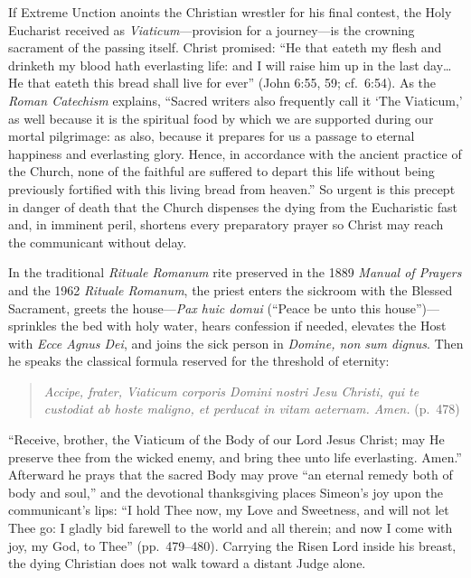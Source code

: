 If Extreme Unction anoints the Christian wrestler for his final contest, the Holy Eucharist received as \emph{Viaticum}---provision for a journey---is the crowning sacrament of the passing itself. Christ promised: ``He that eateth my flesh and drinketh my blood hath everlasting life: and I will raise him up in the last day\ldots{} He that eateth this bread shall live for ever'' (John 6:55, 59; cf.\ 6:54). As the \emph{Roman Catechism} explains, ``Sacred writers also frequently call it `The Viaticum,' as well because it is the spiritual food by which we are supported during our mortal pilgrimage: as also, because it prepares for us a passage to eternal happiness and everlasting glory. Hence, in accordance with the ancient practice of the Church, none of the faithful are suffered to depart this life without being previously fortified with this living bread from heaven.'' So urgent is this precept in danger of death that the Church dispenses the dying from the Eucharistic fast and, in imminent peril, shortens every preparatory prayer so Christ may reach the communicant without delay.

In the traditional \emph{Rituale Romanum} rite preserved in the 1889 \emph{Manual of Prayers} and the 1962 \emph{Rituale Romanum}, the priest enters the sickroom with the Blessed Sacrament, greets the house---\emph{Pax huic domui} (``Peace be unto this house'')---sprinkles the bed with holy water, hears confession if needed, elevates the Host with \emph{Ecce Agnus Dei}, and joins the sick person in \emph{Domine, non sum dignus}. Then he speaks the classical formula reserved for the threshold of eternity:

\begin{quote}
\emph{Accipe, frater, Viaticum corporis Domini nostri Jesu Christi, qui te custodiat ab hoste maligno, et perducat in vitam aeternam. Amen.} (p.\ 478)
\end{quote}

``Receive, brother, the Viaticum of the Body of our Lord Jesus Christ; may He preserve thee from the wicked enemy, and bring thee unto life everlasting. Amen.'' Afterward he prays that the sacred Body may prove ``an eternal remedy both of body and soul,'' and the devotional thanksgiving places Simeon's joy upon the communicant's lips: ``I hold Thee now, my Love and Sweetness, and will not let Thee go: I gladly bid farewell to the world and all therein; and now I come with joy, my God, to Thee'' (pp.\ 479--480). Carrying the Risen Lord inside his breast, the dying Christian does not walk toward a distant Judge alone.

